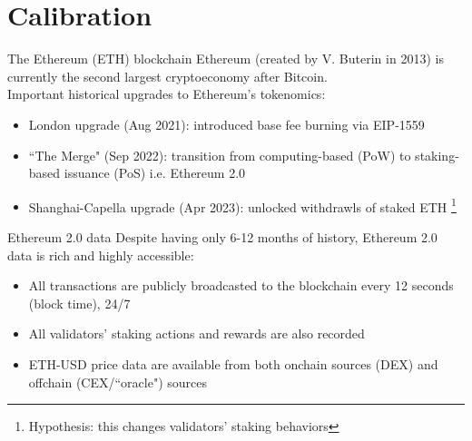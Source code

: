 \documentclass{beamer}
\begin{document}
\section{Calibration}

\begin{frame}{The Ethereum (ETH) blockchain}
    Ethereum (created by V. Buterin in 2013) is currently the second largest cryptoeconomy after Bitcoin.\\
    \bigskip
    Important historical upgrades to Ethereum's tokenomics:
    \begin{itemize}
        \item London upgrade (Aug 2021): introduced base fee burning via EIP-1559
        \item ``The Merge" (Sep 2022): transition from computing-based (PoW) to staking-based issuance (PoS) i.e. Ethereum 2.0
        \item Shanghai-Capella upgrade (Apr 2023): unlocked withdrawls of staked ETH \footnote{Hypothesis: this changes validators' staking behaviors}
    \end{itemize}
\end{frame}

\begin{frame}{Ethereum 2.0 data}
    Despite having only 6-12 months of history, Ethereum 2.0 data is rich and highly accessible:
    \begin{itemize}
        \item All transactions are publicly broadcasted to the blockchain every 12 seconds (block time), 24/7
        \item All validators' staking actions and rewards are also recorded
        \item ETH-USD price data are available from both onchain sources (DEX) and offchain (CEX/``oracle") sources
    \end{itemize}

\end{frame}
\end{document}

